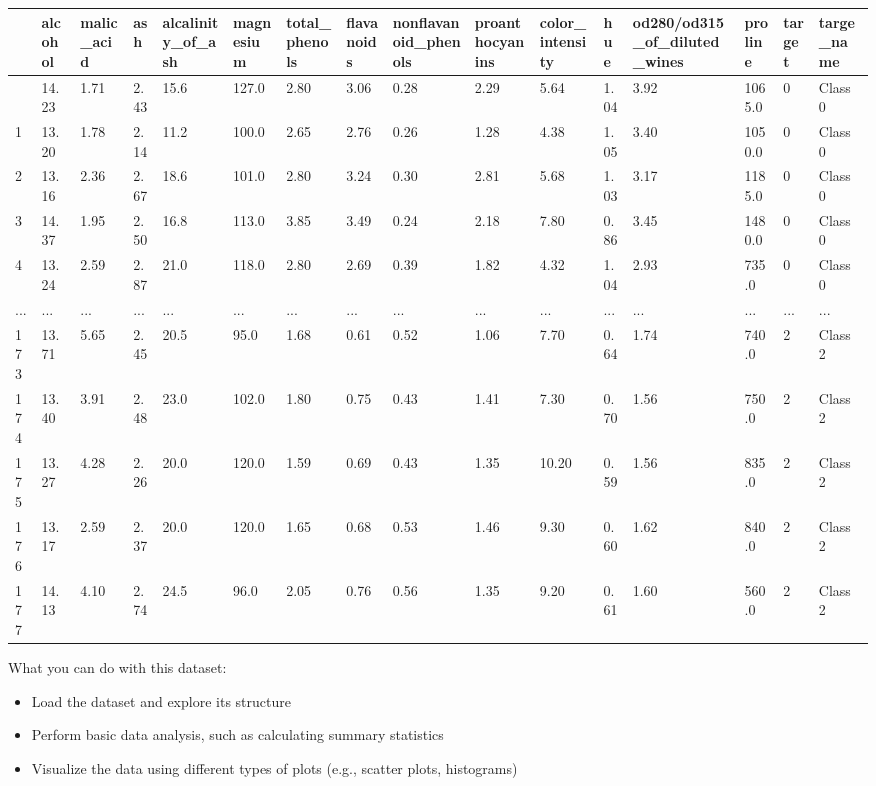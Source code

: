 \documentclass[
  letterpaper,
  DIV=11,
  numbers=noendperiod]{scrreprt}
\providecommand{\tightlist}{%
  \setlength{\itemsep}{0pt}\setlength{\parskip}{0pt}}\usepackage{longtable,booktabs,array}
\begin{document}
\begin{longtable}[]{@{}llllllllllllllll@{}}
\toprule\noalign{}
& alcohol & malic\_acid & ash & alcalinity\_of\_ash & magnesium &
total\_phenols & flavanoids & nonflavanoid\_phenols & proanthocyanins &
color\_intensity & hue & od280/od315\_of\_diluted\_wines & proline &
target & targe\_name \\
\midrule\noalign{}
\endhead
\bottomrule\noalign{}
\endlastfoot
0 & 14.23 & 1.71 & 2.43 & 15.6 & 127.0 & 2.80 & 3.06 & 0.28 & 2.29 &
5.64 & 1.04 & 3.92 & 1065.0 & 0 & Class 0 \\
1 & 13.20 & 1.78 & 2.14 & 11.2 & 100.0 & 2.65 & 2.76 & 0.26 & 1.28 &
4.38 & 1.05 & 3.40 & 1050.0 & 0 & Class 0 \\
2 & 13.16 & 2.36 & 2.67 & 18.6 & 101.0 & 2.80 & 3.24 & 0.30 & 2.81 &
5.68 & 1.03 & 3.17 & 1185.0 & 0 & Class 0 \\
3 & 14.37 & 1.95 & 2.50 & 16.8 & 113.0 & 3.85 & 3.49 & 0.24 & 2.18 &
7.80 & 0.86 & 3.45 & 1480.0 & 0 & Class 0 \\
4 & 13.24 & 2.59 & 2.87 & 21.0 & 118.0 & 2.80 & 2.69 & 0.39 & 1.82 &
4.32 & 1.04 & 2.93 & 735.0 & 0 & Class 0 \\
... & ... & ... & ... & ... & ... & ... & ... & ... & ... & ... & ... &
... & ... & ... & ... \\
173 & 13.71 & 5.65 & 2.45 & 20.5 & 95.0 & 1.68 & 0.61 & 0.52 & 1.06 &
7.70 & 0.64 & 1.74 & 740.0 & 2 & Class 2 \\
174 & 13.40 & 3.91 & 2.48 & 23.0 & 102.0 & 1.80 & 0.75 & 0.43 & 1.41 &
7.30 & 0.70 & 1.56 & 750.0 & 2 & Class 2 \\
175 & 13.27 & 4.28 & 2.26 & 20.0 & 120.0 & 1.59 & 0.69 & 0.43 & 1.35 &
10.20 & 0.59 & 1.56 & 835.0 & 2 & Class 2 \\
176 & 13.17 & 2.59 & 2.37 & 20.0 & 120.0 & 1.65 & 0.68 & 0.53 & 1.46 &
9.30 & 0.60 & 1.62 & 840.0 & 2 & Class 2 \\
177 & 14.13 & 4.10 & 2.74 & 24.5 & 96.0 & 2.05 & 0.76 & 0.56 & 1.35 &
9.20 & 0.61 & 1.60 & 560.0 & 2 & Class 2 \\
\end{longtable}

What you can do with this dataset:

\begin{itemize}
\tightlist
\item
  Load the dataset and explore its structure
\item
  Perform basic data analysis, such as calculating summary statistics
\item
  Visualize the data using different types of plots (e.g., scatter
  plots, histograms)
\end{itemize}
\end{document}
